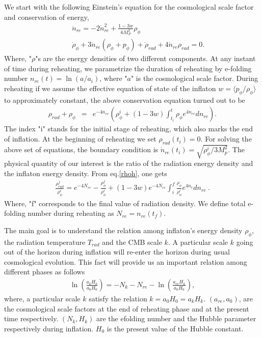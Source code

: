 \documentclass[prl,twocolumn,superscriptaddress,doublespace]{revtex4}%
\def\bea{\begin{eqnarray}}
\def\eea{\end{eqnarray}}
\def\nno{\nonumber}
\begin{document}
We start with the following Einstein's equation for the cosmological scale factor and conservation of energy, 
\bea \label{rhoh}
&&\ddot{n}_{re} = - 2 \dot{n}_{re}^2  + \frac{1-3 w}{6 M_P^2} \rho_{\phi} \\ \nno
&&\dot{\rho}_{\phi} + 3 \dot{n}_{re}(\rho_{\phi}+p_{\phi})
+ \dot{\rho}_{rad} + 4 \dot{n}_{re} \rho_{rad} = 0 .
\eea
Where, "$\rho$"s are the energy densities of two different components.
 At any instant of time during reheating, we parametrize the duration of reheating by e-folding number $n_{re}(t) = \ln (a/a_i)$,
 where "$a$" is the cosmological scale factor. During reheating if we assume the effective equation of state of the inflaton $w =\langle p_{\phi}/\rho_{\phi}\rangle$ to approximately constant, the above conservation equation turned out to be  
\bea \label{rhoh}
\rho_{rad}+ \rho_{\phi} &=&  e^{-4 n_{re}}\left(\rho^{i}_{\phi} + (1-3 w)  \int_{t_i}^{t}  \rho_{\phi} e^{4 n_{re}}  dn_{re}\right).
\eea 
The index "i" stands for the initial stage of reheating, which also marks the end of inflation.
At the beginning of reheating we set $\rho_{rad}(t_i) = 0$. For solving the above set of equations, the boundary condition is $ \dot{n}_{re}(t_i) = \sqrt{{\rho^i_{\phi}}/{3 M_p^2}}$.
 The physical quantity of our interest is the ratio of the radiation energy density and the inflaton energy density. From eq.\ref{rhoh}, one gets
\bea
\frac{\rho^f_{rad}}{\rho^i_{\phi}} = e^{-4 N_{re}} -
\frac {\rho^f_{\phi}} {\rho^i_{\phi}}
+ (1-3 w)e^{-4 N_{re}} \int_i^{f} \frac{\rho_{\phi}}{\rho^i_{\phi}} e^{4 n_r}  dn_{re} ~.
\eea
Where, "f" corresponds to the final value of radiation density. We define total e-folding number during reheating as
$N_{re} = n_{re}(t_f)$.

The main goal is to understand the relation among inflaton's energy density $\rho_{\phi}$, the radiation temperature $T_{rad}$ and the CMB scale $k$.
A particular scale $k$ going out of the horizon during inflation will re-enter the horizon during
usual cosmological evolution. This fact will provide us an important relation among different phases  as follows 
\bea
\ln{\left(\frac {a_k H_k}{a_0 H_0}\right)} =-N_k -N_{re} -
\ln{\left(\frac {a_{re} H_k}{a_0 H_0}\right)},
\label{scalek}
\eea  
where, a particular scale $k$ satisfy the relation $k = a_0 H_0 = a_k H_k$. $(a_{re}, a_0)$, are the cosmological scale factors at the end of reheating phase and at the present time respectively.
$(N_k,H_k)$ are the efolding number and the Hubble parameter respectively during inflation. $H_0$ is the present value of the Hubble constant.
\end{document}
